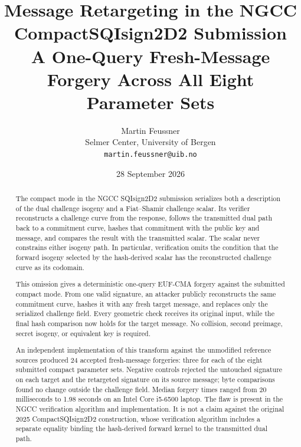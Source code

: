 \documentclass[11pt,a4paper]{article}
\title{\bfseries Message Retargeting in the NGCC
CompactSQIsign2D2 Submission\\[0.25em]
\large A One-Query Fresh-Message Forgery Across All Eight Parameter Sets}
\author{Martin Feussner\\
\small Selmer Center, University of Bergen\\
\small \texttt{martin.feussner@uib.no}}
\date{28 September 2026}
\begin{document}
\maketitle

\begin{center}
\end{center}
\vspace{0.7em}

\begin{abstract}
The compact mode in the NGCC SQIsign2D2 submission serializes both a description of the dual
challenge isogeny and a Fiat--Shamir challenge scalar.  Its verifier reconstructs a challenge
curve from the response, follows the transmitted dual path back to a commitment curve, hashes
that commitment with the public key and message, and compares the result with the transmitted
scalar.  The scalar never constrains either isogeny path.  In particular, verification omits the
condition that the forward isogeny selected by the hash-derived scalar has the reconstructed
challenge curve as its codomain.

This omission gives a deterministic one-query EUF-CMA forgery against the submitted compact
mode.  From one valid signature, an attacker publicly reconstructs the same commitment curve,
hashes it with any fresh target message, and replaces only the serialized challenge field.  Every
geometric check receives its original input, while the final hash comparison now holds for the
target message.  No collision, second preimage, secret isogeny, or equivalent key is required.

An independent implementation of this transform against the unmodified reference sources
produced 24 accepted fresh-message forgeries: three for each of the eight submitted compact
parameter sets.  Negative controls rejected the untouched signature on each target and the
retargeted signature on its source message; byte comparisons found no change outside the
challenge field.  Median forgery times ranged from 20 milliseconds to 1.98 seconds on an Intel
Core i5-6500 laptop.  The flaw is present in the NGCC verification algorithm and implementation.
It is not a claim against the original 2025 CompactSQIsign2D2 construction, whose verification
algorithm includes a separate equality binding the hash-derived forward kernel to the transmitted
dual path.
\end{abstract}
\end{document}
